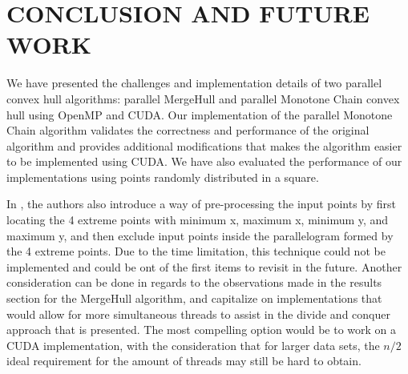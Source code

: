 \documentclass{article}
\begin{document}
\section{CONCLUSION AND FUTURE WORK}
We have presented the challenges and implementation details of two parallel convex hull algorithms: parallel MergeHull and parallel Monotone Chain convex hull using OpenMP and CUDA. Our implementation of the parallel Monotone Chain algorithm validates the correctness and performance of the original algorithm and provides additional modifications that makes the algorithm easier to be implemented using CUDA. We have also evaluated the performance of our implementations using points randomly distributed in a square.

In \cite{zhang2015novel}, the authors also introduce a way of pre-processing the input points by first locating the 4 extreme points with minimum x, maximum x, minimum y, and maximum y, and then exclude input points inside the parallelogram formed by the 4 extreme points. Due to the time limitation, this technique could not be implemented and could be ont of the first items to revisit in the future. Another consideration can be done in regards to the observations made in the results section for the MergeHull algorithm, and capitalize on implementations that would allow for more simultaneous threads to assist in the divide and conquer approach that is presented. The most compelling option would be to work on a CUDA implementation, with the consideration that for larger data sets, the $n/2$ ideal requirement for the amount of threads may still be hard to obtain.

  



\end{document}

